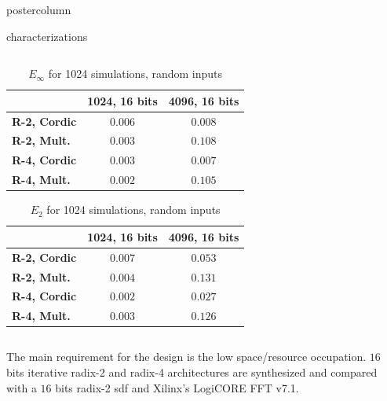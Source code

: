 \documentclass[final]{beamer}
\begin{document}
\begin{frame}{}
\begin{columns}
\begin{column}{.5\textwidth}
\begin{beamercolorbox}[center,wd=\textwidth]{postercolumn}
\begin{minipage}[T]{.99\textwidth}
{\begin{block}{characterizations}
\begin{column}{.37\textwidth}
			\end{column}
			\vrule
			\begin{column}{.52\textwidth}
				\begin{table}[htb!]
				\caption{$E_\infty$ for 1024 simulations, random inputs}
				\begin{tabular}{l c c}
				 & \textbf{1024, 16 bits} & \textbf{4096, 16 bits}\\ \hline 
				\textbf{R-2, Cordic} & $0.006$ & $0.008 $\\
				\textbf{R-2, Mult.} & $0.003$ & $0.108$\\
				\textbf{R-4, Cordic} & $0.003$ & $0.007$\\
				\textbf{R-4, Mult.} & $0.002$ & $0.105$\\\hline
				\end{tabular}
				\label{table:errorInf}
				\end{table}
				\begin{table}[htb!]
				\caption{$E_2$ for 1024 simulations, random inputs}
				\begin{tabular}{l c c}
				 & \textbf{1024, 16 bits} & \textbf{4096, 16 bits}\\ \hline 
				\textbf{R-2, Cordic} & $0.007$  & $0.053$\\
				\textbf{R-2, Mult.} & $0.004$ & $0.131$\\
				\textbf{R-4, Cordic} & $0.002$ & $0.027$\\
				\textbf{R-4, Mult.} & $0.003$ & $0.126$\\\hline 
				\end{tabular}
				\label{table:error2}
				\end{table}
			\end{column}
			
			\begin{column}{.34\textwidth}
			The main requirement for the design is the low space/resource occupation. $16$ bits iterative radix-2 and radix-4 architectures are 
			synthesized and compared with a $16$ bits radix-2 sdf and Xilinx's LogiCORE FFT v7.1.
				

\end{column}
\end{block}}
\end{minipage}
\end{beamercolorbox}
\end{column}
\end{columns}
\end{frame}
\end{document}
